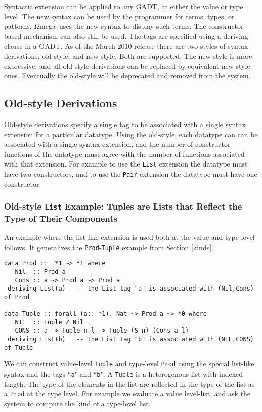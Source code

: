 \documentclass[11pt,twoside]{article}
\newcommand{\om}{$\Omega$mega}
\begin{document}
Syntactic extension can be applied to any GADT, at either the value or type level. The
new syntax can be used by the programmer for terms, types, or patterns. \om\ uses the
new syntax to display such terms. The constructor based mechanism can also still
be used. The tags are specified using a deriving clause in a GADT. As of the March 2010
release there are two styles of syntax derivations: old-style, and new-style. Both are
supported. The new-style is more expressive, and all old-style derivations
can be replaced by equivalent new-style ones. Eventually the old-style will
be deprecated and removed from the system.

\subsection{Old-style Derivations}

Old-style derivations specify a single tag to be associated with a single syntax
extension for a particular datatype. Using the old-style, each datatype can can be associated with a
single syntax extension, and the number of constructor functions of the datatype
must agree with the number of functions associated with that extension. For example
to use the {\tt List} extension the datatype must have two constructors, and to use
the {\tt Pair} extension the datatype must have one constructor.


\subsubsection{Old-style {\tt List} Example: Tuples are Lists that Reflect the Type of Their Components}

An example where the
list-like extension is used both at the value and type level follows.
It generalizes the {\tt Prod}-{\tt Tuple} example from Section \ref{kinds}.



\begin{verbatim}
data Prod ::  *1 ~> *1 where
   Nil  :: Prod a
   Cons :: a ~> Prod a ~> Prod a
 deriving List(a)   -- the List tag "a" is associated with (Nil,Cons) of Prod

data Tuple :: forall (a:: *1). Nat ~> Prod a ~> *0 where
   NIL  :: Tuple Z Nil
   CONS :: a -> Tuple n l -> Tuple (S n) (Cons a l)
 deriving List(b)   -- the List tag "b" is associated with (NIL,CONS) of Tuple
\end{verbatim} 
We can construct value-level {\tt Tuple} and type-level {\tt Prod} using
the special list-like syntax and the tags ``{\tt a}" and ``{\tt b}". A {\tt Tuple}
is a heterogenous list with indexed length. The type of the elements in
the list are reflected in the type of the list as a {\tt Prod} at the type
level. For example we evaluate a value level-list, and ask the system
to compute the kind of a type-level list.
\end{document}
